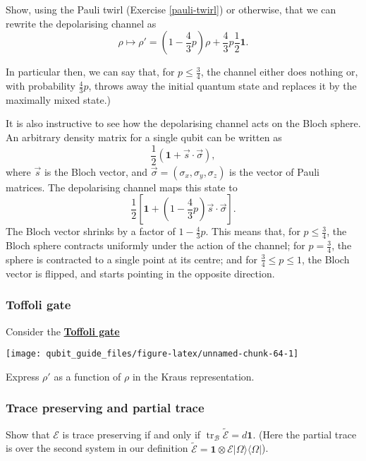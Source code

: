 \documentclass[fleqn]{article}
\begin{document}
Show, using the Pauli twirl (Exercise \ref{pauli-twirl}) or otherwise, that we can rewrite the depolarising channel as
\[
  \rho \longmapsto \rho'
  = \left(1-\frac{4}{3} p\right) \rho + \frac{4}{3}p\frac{1}{2}\mathbf{1}.
\]

In particular then, we can say that, for \(p\leqslant\frac34\), the channel either does nothing or, with probability \(\frac{4}{3}p\), throws away the initial quantum state and replaces it by the maximally mixed state.)

It is also instructive to see how the depolarising channel acts on the Bloch sphere.
An arbitrary density matrix for a single qubit can be written as
\[
  \frac{1}{2}(\mathbf{1}+\vec{s}\cdot\vec{\sigma}),
\]
where \(\vec{s}\) is the Bloch vector, and \(\vec{\sigma}=(\sigma_x,\sigma_y,\sigma_z)\) is the vector of Pauli matrices.
The depolarising channel maps this state to
\[
  \frac{1}{2}\left[
    \mathbf{1}+ \left(1-\frac{4}{3}p\right)\vec{s}\cdot\vec{\sigma}
  \right].
\]
The Bloch vector shrinks by a factor of \(1-\frac{4}{3}p\).
This means that, for \(p\leqslant\frac{3}{4}\), the Bloch sphere contracts uniformly under the action of the channel;
for \(p=\frac{3}{4}\), the sphere is contracted to a single point at its centre;
and for \(\frac{3}{4}\leqslant p\leqslant 1\), the Bloch vector is flipped, and starts pointing in the opposite direction.

\hypertarget{toffoli-gate}{%
\subsubsection{Toffoli gate}\label{toffoli-gate}}

Consider the \href{https://en.wikipedia.org/wiki/Toffoli_gate}{\textbf{Toffoli gate}}

\begin{center}\texttt{[image: qubit\_guide\_files/figure-latex/unnamed-chunk-64-1]} \end{center}

Express \(\rho'\) as a function of \(\rho\) in the Kraus representation.

\hypertarget{trace-preserving-and-partial-trace}{%
\subsubsection{Trace preserving and partial trace}\label{trace-preserving-and-partial-trace}}

Show that \(\mathcal{E}\) is trace preserving if and only if \(\operatorname{tr}_\mathcal{B}\widetilde{\mathcal{E}} = d\mathbf{1}\).
(Here the partial trace is over the second system in our definition \(\widetilde{\mathcal{E}}=\mathbf{1}\otimes\mathcal{E}|\Omega\rangle\langle\Omega|\)).
\end{document}
